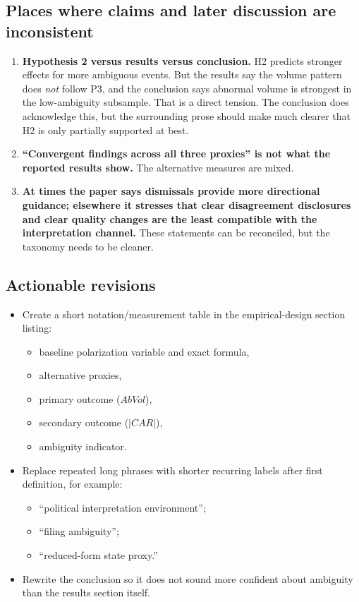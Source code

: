 \documentclass[11pt]{article}
\begin{document}
\subsection*{Places where claims and later discussion are inconsistent}
\begin{enumerate}
    \item \textbf{Hypothesis 2 versus results versus conclusion.} H2 predicts stronger effects for more ambiguous events. But the results say the volume pattern does \emph{not} follow P3, and the conclusion says abnormal volume is strongest in the low-ambiguity subsample. That is a direct tension. The conclusion does acknowledge this, but the surrounding prose should make much clearer that H2 is only partially supported at best.
    \item \textbf{``Convergent findings across all three proxies'' is not what the reported results show.} The alternative measures are mixed.
    \item \textbf{At times the paper says dismissals provide more directional guidance; elsewhere it stresses that clear disagreement disclosures and clear quality changes are the least compatible with the interpretation channel.} These statements can be reconciled, but the taxonomy needs to be cleaner.
\end{enumerate}

\subsection*{Actionable revisions}
\begin{itemize}
    \item Create a short notation/measurement table in the empirical-design section listing:
    \begin{itemize}
        \item baseline polarization variable and exact formula,
        \item alternative proxies,
        \item primary outcome ($AbVol$),
        \item secondary outcome ($|CAR|$),
        \item ambiguity indicator.
    \end{itemize}
    \item Replace repeated long phrases with shorter recurring labels after first definition, for example:
    \begin{itemize}
        \item ``political interpretation environment'';
        \item ``filing ambiguity'';
        \item ``reduced-form state proxy.''
    \end{itemize}
    \item Rewrite the conclusion so it does not sound more confident about ambiguity than the results section itself.
\end{itemize}
\end{document}
